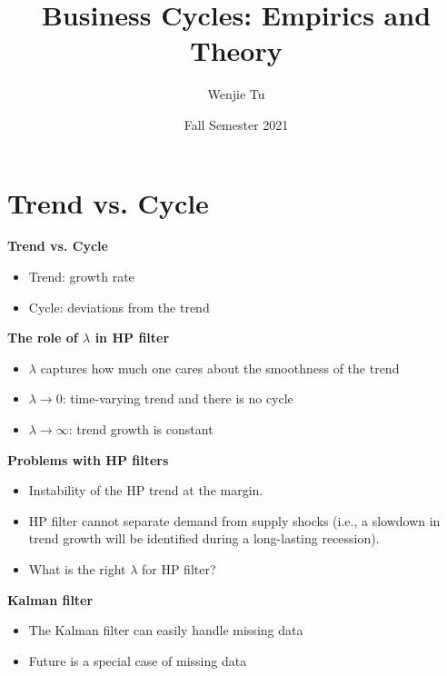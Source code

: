 \documentclass[a4paper]{article}
\title{%
     Business Cycles: Empirics and Theory
}
\author{Wenjie Tu}
\date{Fall Semester 2021}
\begin{document}

\section{Trend vs. Cycle}
\textbf{Trend vs. Cycle}
\begin{itemize}
    \item Trend: growth rate
    \item Cycle: deviations from the trend
\end{itemize}
\textbf{The role of $\lambda$ in HP filter}
\begin{itemize}
    \item $\lambda$ captures how much one cares about the smoothness of the trend
    \item $\lambda\to0$: time-varying trend and there is no cycle
    \item $\lambda\to\infty$: trend growth is constant
\end{itemize}
\textbf{Problems with HP filters}
\begin{itemize}
    \item Instability of the HP trend at the margin.
    \item HP filter cannot separate demand from supply shocks (i.e., a slowdown in trend growth will be identified during a long-lasting recession).
    \item What is the right $\lambda$ for HP filter?
\end{itemize}
\textbf{Kalman filter}
\begin{itemize}
    \item The Kalman filter can easily handle missing data
    \item Future is a special case of missing data
\end{itemize}
\end{document}
